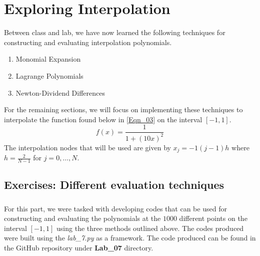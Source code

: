 \documentclass{article}
\begin{document}
\section{Exploring Interpolation}
Between class and lab, we have now learned the following techniques for constructing and evaluating interpolation polynomials.
\begin{enumerate}
    \item Monomial Expansion
    \item Lagrange Polynomials
    \item Newton-Dividend Differences
\end{enumerate}
For the remaining sections, we will focus on implementing these techniques to interpolate the function found below in \ref{Eqn_03} on the interval \([-1,1]\).
\begin{equation}
    \label{Eqn_03}
    f(x) = \frac{1}{1+(10x)^2}
\end{equation}
The interpolation nodes that will be used are given by \(x_j=-1(j-1)h\) where \(h=\frac{2}{N-1}\) for \(j=0,\dots,N\).

\subsection{Exercises: Different evaluation techniques}
\subsubsection{}
For this part, we were tasked with developing codes that can be used for constructing and evaluating the polynomials at the \(1000\) different points on the interval \([-1,1]\) using the three methods outlined above. The codes produced were built using the \textit{lab\_7.py} as a framework. The code produced can be found in the GitHub repository under \textbf{Lab\_07} directory.
\end{document}
